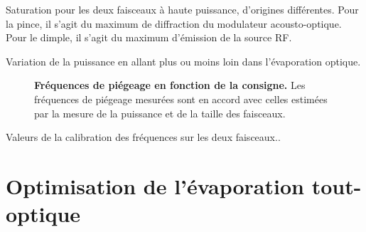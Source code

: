Saturation pour les deux faisceaux à haute puissance, d'origines différentes. Pour la pince, il s'agit du maximum de diffraction du modulateur acousto-optique. Pour le dimple, il s'agit du maximum d'émission de la source RF. 

Variation de la puissance en allant plus ou moins loin dans l'évaporation optique.



\begin{figure}
\centering

\caption{\textbf{Fréquences de piégeage en fonction de la consigne.} Les fréquences de piégeage mesurées sont en accord avec celles estimées par la mesure de la puissance et de la taille des faisceaux.}
\label{fig:frequences_piege_optique}
\end{figure}

Valeurs de la calibration des fréquences sur les deux faisceaux..



\section{Optimisation de l'évaporation tout-optique}
\label{sc:evap_optique}

